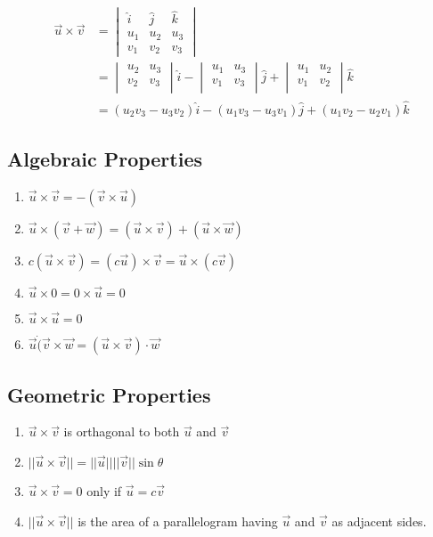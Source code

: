 \begin{equation}
  \begin{aligned}
    \vec{u}\times\vec{v} &= \begin{vmatrix}
      \hat{i} & \hat{j} & \hat{k} \\
      u_1     & u_2     & u_3 \\
      v_1     & v_2     & v_3
    \end{vmatrix} \\
  &= \begin{vmatrix}
    u_2 & u_3 \\
    v_2 & v_3 \\
  \end{vmatrix}\hat{i} -
  \begin{vmatrix}
    u_1 & u_3 \\
    v_1 & v_3 \\
  \end{vmatrix}\hat{j} +
  \begin{vmatrix}
    u_1 & u_2 \\
    v_1 & v_2 \\
  \end{vmatrix}\hat{k}\\
  &= (u_2v_3-u_3v_2)\hat{i} - (u_1v_3-u_3v_1)\hat{j} + (u_1v_2-u_2v_1)\hat{k}
  \end{aligned}
\end{equation}

\subsection{Algebraic Properties}
\begin{enumerate}
  \item $\vec{u}\times\vec{v}=-(\vec{v}\times\vec{u})$
  \item
    $\vec{u}\times(\vec{v}+\vec{w})=(\vec{u}\times\vec{v})+
    (\vec{u}\times\vec{w})$
  \item
    $c(\vec{u}\times\vec{v})=(c\vec{u})\times\vec{v}=\vec{u}\times(c\vec{v})$
  \item $\vec{u}\times0=0\times\vec{u}=0$
  \item $\vec{u}\times\vec{u}=0$
  \item $\vec{u}\dot(\vec{v}\times\vec{w}=(\vec{u}\times\vec{v})\cdot\vec{w}$
\end{enumerate}

\subsection{Geometric Properties}
\begin{enumerate}
  \item $\vec{u}\times\vec{v}$ is orthagonal to both $\vec{u}$ and $\vec{v}$
  \item $||\vec{u}\times\vec{v}||=||\vec{u}||||\vec{v}||\sin\theta$
  \item $\vec{u}\times\vec{v}=0$ only if $\vec{u}=c\vec{v}$
  \item $||\vec{u}\times\vec{v}||$ is the area of a parallelogram having
    $\vec{u}$ and $\vec{v}$ as adjacent sides.
\end{enumerate}


